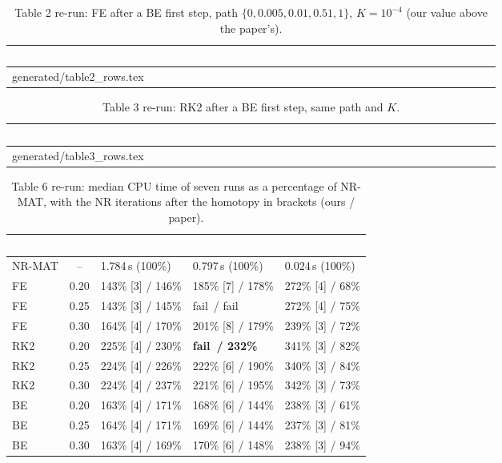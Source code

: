 \documentclass[11pt,a4paper]{article}
\makeatletter
\newcommand{\thead}[1]{\textcolor{white}{\sffamily\bfseries\small #1}}
\newcommand{\headrow}{\rowcolor{navy}}
\newcommand{\fail}{\textcolor{failred}{fail}}
\newcommand{\rows}[1]{\@@input #1 }
\newcommand{\code}[1]{\texttt{#1}}
\makeatother
\begin{document}
\begin{table}[h]
\centering
\caption[Table 2 re-run: FE then NR]{Table 2 re-run: FE after a BE first step, path $\{0,0.005,0.01,0.51,1\}$,
$K=10^{-4}$ (our value above the paper's).}
\label{tab:fe}
\scriptsize
\setlength{\tabcolsep}{3pt}
\begin{tabular}{@{}l l r r r r r r r r l@{}}
\toprule
\headrow \thead{Case} & & \thead{$t{=}0$} & \thead{0.005} & \thead{0.01} & \thead{0.51} & \thead{1} & \thead{NR 1} & \thead{NR 2} & \thead{NR 3} & \thead{Result} \\
\midrule
\rows{generated/table2_rows.tex}
\bottomrule
\end{tabular}
\end{table}

\begin{table}[h]
\centering
\caption[Table 3 re-run: RK2 then NR]{Table 3 re-run: RK2 after a BE first step, same path and $K$.}
\label{tab:rk2}
\scriptsize
\setlength{\tabcolsep}{3pt}
\begin{tabular}{@{}l l r r r r r r r r l@{}}
\toprule
\headrow \thead{Case} & & \thead{$t{=}0$} & \thead{0.005} & \thead{0.01} & \thead{0.51} & \thead{1} & \thead{NR 1} & \thead{NR 2} & \thead{NR 3} & \thead{Result} \\
\midrule
\rows{generated/table3_rows.tex}
\bottomrule
\end{tabular}
\end{table}

\begin{table}[h]
\centering
\caption[Table 6 re-run: five-point paths, run time]{Table 6 re-run: median CPU time of seven runs as a
percentage of NR-MAT, with the NR iterations after the homotopy in brackets (ours / paper).}
\label{tab:t6}
\footnotesize
\setlength{\tabcolsep}{4pt}
\begin{tabular}{@{}l c l l l@{}}
\toprule
\headrow \thead{Method} & \thead{$t_3$} & \thead{\code{case109272}} & \thead{\code{case36964}} & \thead{\code{case2000limit}} \\
\midrule
NR-MAT & -- & 1.784\,s (100\%) & 0.797\,s (100\%) & 0.024\,s (100\%) \\
\midrule
FE  & 0.20 & 143\% [3] / 146\% & 185\% [7] / 178\% & 272\% [4] / 68\% \\
FE  & 0.25 & 143\% [3] / 145\% & \fail\ / \fail & 272\% [4] / 75\% \\
FE  & 0.30 & 164\% [4] / 170\% & 201\% [8] / 179\% & 239\% [3] / 72\% \\
RK2 & 0.20 & 225\% [4] / 230\% & \textbf{\fail\ / 232\%} & 341\% [3] / 82\% \\
RK2 & 0.25 & 224\% [4] / 226\% & 222\% [6] / 190\% & 340\% [3] / 84\% \\
RK2 & 0.30 & 224\% [4] / 237\% & 221\% [6] / 195\% & 342\% [3] / 73\% \\
BE  & 0.20 & 163\% [4] / 171\% & 168\% [6] / 144\% & 238\% [3] / 61\% \\
BE  & 0.25 & 164\% [4] / 171\% & 169\% [6] / 144\% & 237\% [3] / 81\% \\
BE  & 0.30 & 163\% [4] / 169\% & 170\% [6] / 148\% & 238\% [3] / 94\% \\
\bottomrule
\end{tabular}
\end{table}
\end{document}
